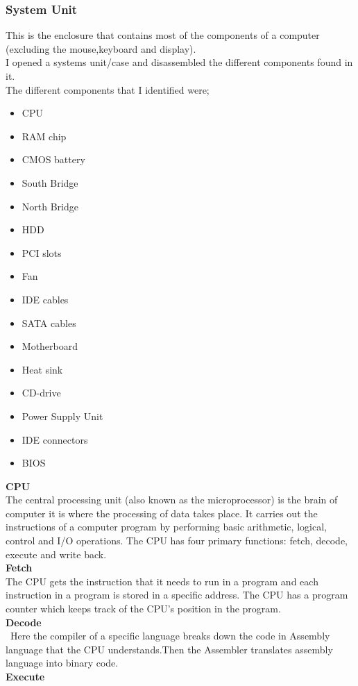 \documentclass{article}
\begin{document}
\subsubsection{System Unit} \cite{morley2014understanding}
This is the enclosure that contains most of the components of a computer (excluding the mouse,keyboard and display).\\
I opened a systems unit/case and disassembled the different components found in it.\\
The different components that I identified were;
\begin{itemize}
\item CPU
\item  RAM chip
\item CMOS battery
\item South Bridge
\item North Bridge
\item HDD
\item PCI slots
\item Fan
\item IDE cables
 \item SATA cables
\item  Motherboard
 \item Heat sink
\item CD-drive
 \item Power Supply Unit
\item IDE connectors
\item BIOS
\end{itemize}
\textbf{CPU}\\
 The central processing unit (also known as the microprocessor) is the brain of computer it is where the processing of data takes place. It carries out the instructions of a computer program by performing basic arithmetic, logical, control and I/O operations. The CPU has four primary functions: fetch, decode, execute and write back.\\
\textbf{Fetch}\\
 The CPU gets the instruction that it needs to run in a program and each instruction in a program is stored in a specific address. The CPU has a program counter which keeps track of the CPU's position in the program.\\
\textbf{Decode}\\
\ Here the compiler of a specific language breaks down the code in Assembly language that the CPU understands.Then the Assembler translates assembly language into binary code.\\
\textbf{Execute}\\
\end{document}
